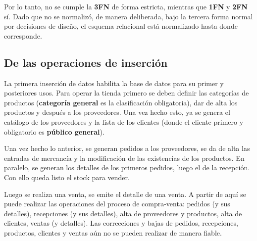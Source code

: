 \documentclass[11pt]{article}
\begin{document}
Por lo tanto, no se cumple la \textbf{3FN} de forma estricta, mientras que \textbf{1FN} y \textbf{2FN} sí. Dado que no se normalizó, de manera deliberada, bajo la tercera forma normal por decisiones de diseño, el esquema relacional está normalizado hasta donde corresponde.

\subsection*{\centering De las operaciones de inserción}

La primera inserción de datos habilita la base de datos para su primer y posteriores usos. Para operar la tienda primero se deben definir las categorías de productos (\textbf{categoría general} es la clasificación obligatoria), dar de alta los productos y después a los proveedores. Una vez hecho esto, ya se genera el catálogo de los proveedores y la lista de los clientes (donde el cliente primero y obligatorio es \textbf{público general}).
\newline

Una vez hecho lo anterior, se generan pedidos a los proveedores, se da de alta las entradas de mercancía y la modificación de las existencias de los productos. En paralelo, se generan los detalles de los primeros pedidos, luego el de la recepción. Con ello queda listo el stock para vender.
\newline

Luego se realiza una venta, se emite el detalle de una venta. A partir de aquí se puede realizar las operaciones del proceso de compra-venta: pedidos (y sus detalles), recepciones (y sus detalles), alta de proveedores y productos, alta de clientes, ventas (y detalles). Las correcciones y bajas de pedidos, recepciones, productos, clientes y ventas aún no se pueden realizar de manera fiable.

\newpage
\listoftables
\listoffigures
\end{document}
